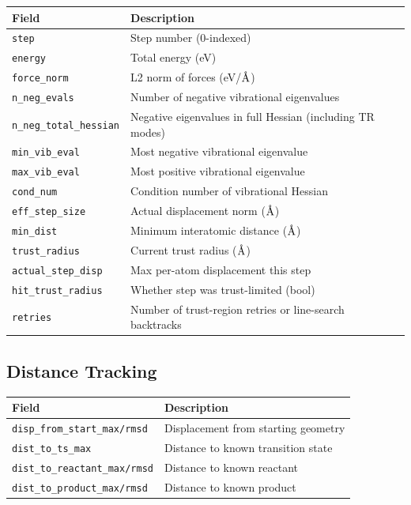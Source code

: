 \documentclass[11pt,a4paper]{article}
\newcommand{\angstrom}{\text{\r{A}}}
\begin{document}
\begin{longtable}{lp{10cm}}
\toprule
Field & Description \\
\midrule
\endfirsthead
\texttt{step} & Step number (0-indexed) \\
\texttt{energy} & Total energy (eV) \\
\texttt{force\_norm} & L2 norm of forces (eV/$\angstrom$) \\
\texttt{n\_neg\_evals} & Number of negative vibrational eigenvalues \\
\texttt{n\_neg\_total\_hessian} & Negative eigenvalues in full Hessian (including TR modes) \\
\texttt{min\_vib\_eval} & Most negative vibrational eigenvalue \\
\texttt{max\_vib\_eval} & Most positive vibrational eigenvalue \\
\texttt{cond\_num} & Condition number of vibrational Hessian \\
\texttt{eff\_step\_size} & Actual displacement norm ($\angstrom$) \\
\texttt{min\_dist} & Minimum interatomic distance ($\angstrom$) \\
\texttt{trust\_radius} & Current trust radius ($\angstrom$) \\
\texttt{actual\_step\_disp} & Max per-atom displacement this step \\
\texttt{hit\_trust\_radius} & Whether step was trust-limited (bool) \\
\texttt{retries} & Number of trust-region retries or line-search backtracks \\
\bottomrule
\end{longtable}

\subsection{Distance Tracking}

\begin{longtable}{lp{10cm}}
\toprule
Field & Description \\
\midrule
\texttt{disp\_from\_start\_max/rmsd} & Displacement from starting geometry \\
\texttt{dist\_to\_ts\_max} & Distance to known transition state \\
\texttt{dist\_to\_reactant\_max/rmsd} & Distance to known reactant \\
\texttt{dist\_to\_product\_max/rmsd} & Distance to known product \\
\bottomrule
\end{longtable}
\end{document}
